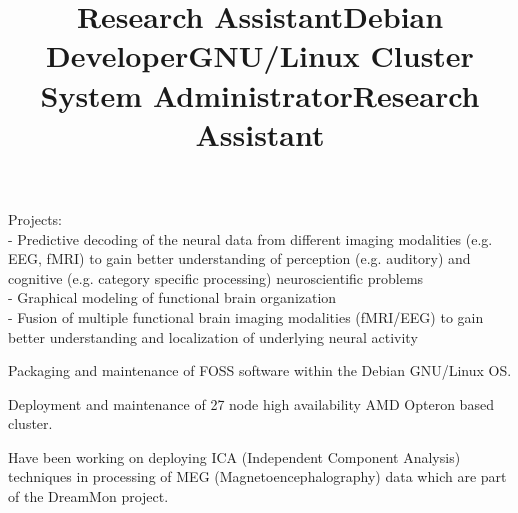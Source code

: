 \documentclass[12pt,overlapped,line]{res}
\begin{document}
\begin{resume}
 \title{Research Assistant}
 \begin{position}
   Projects:\\
   - Predictive decoding of the neural data from different imaging
     modalities (e.g. EEG, fMRI) to gain better understanding of
     perception (e.g. auditory) and cognitive (e.g. category specific
     processing) neuroscientific problems \\
   - Graphical modeling of functional brain organization \\
   - Fusion of multiple functional brain imaging modalities
     (f{MRI}/{EEG}) to gain better understanding and localization of
     underlying neural activity
 \end{position}


 \title{Debian Developer}
 \location{}
 \begin{position}
   Packaging and maintenance of FOSS software within the Debian GNU/Linux OS.
 \end{position}

 \title{GNU/Linux Cluster System Administrator}
 \begin{position}
   Deployment and maintenance of 27 node high availability {AMD}
   {O}pteron based cluster. %
 \end{position}

 \title{Research Assistant}
 \begin{position}
   Have been working  on deploying ICA (Independent Component
   Analysis) techniques in processing of MEG (Magnetoencephalography)
   data which are part of the DreamMon project.


\end{position}
\end{resume}
\end{document}
